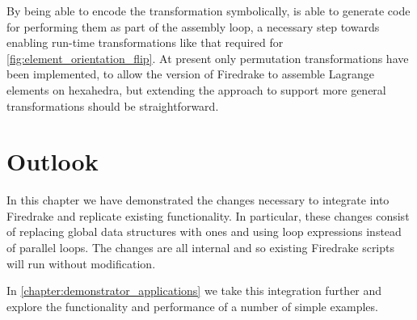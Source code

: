 \documentclass[thesis]{subfiles}
\begin{document}
By being able to encode the transformation symbolically,  is able to generate code for performing them as part of the assembly loop, a necessary step towards enabling run-time transformations like that required for \cref{fig:element_orientation_flip}.
At present only permutation transformations have been implemented, to allow the  version of Firedrake to assemble Lagrange elements on hexahedra, but extending the approach to support more general transformations should be straightforward.

\section{Outlook}

In this chapter we have demonstrated the changes necessary to integrate  into Firedrake and replicate existing  functionality.
In particular, these changes consist of replacing  global data structures with  ones and using  loop expressions instead of  parallel loops.
The changes are all internal and so existing Firedrake scripts will run without modification.

In \cref{chapter:demonstrator_applications} we take this integration further and explore the functionality and performance of a number of simple examples.
\end{document}
